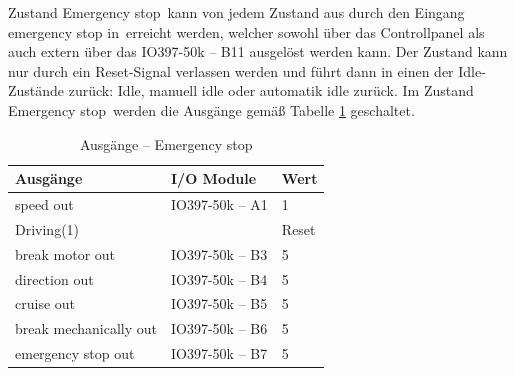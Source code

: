 Zustand \frqq Emergency stop\flqq\ kann von jedem Zustand aus durch den Eingang \frqq emergency stop in\flqq\ erreicht werden, welcher sowohl über das Controllpanel als auch extern über das IO397-50k – B11 ausgelöst werden kann. Der Zustand kann nur durch ein Reset-Signal verlassen werden und führt dann in einen der Idle-Zustände zurück: Idle, manuell idle oder automatik idle zurück. Im Zustand \frqq Emergency stop\flqq\ werden die Ausgänge gemäß Tabelle \ref{Automat_man:tab:z_Emergency_stop} geschaltet.


\pagebreak[1]
\begin{table}[!ht]
	\centering
	\caption{Ausgänge – Emergency stop}
	\label{Automat_man:tab:z_Emergency_stop}
	\begin{tabular}{lll}
		\hline
		\textbf{Ausgänge}                           & \textbf{I/O Module}                 & \textbf{Wert} \\ \hline
		\multicolumn{1}{l|}{speed out}              & \multicolumn{1}{l|}{IO397-50k – A1} & 1             \\
		\multicolumn{1}{l|}{Driving(1)}             & \multicolumn{1}{l|}{}               & Reset         \\
		\multicolumn{1}{l|}{break motor out}        & \multicolumn{1}{l|}{IO397-50k – B3} & 5             \\
		\multicolumn{1}{l|}{direction out}          & \multicolumn{1}{l|}{IO397-50k – B4} & 5             \\
		\multicolumn{1}{l|}{cruise out}             & \multicolumn{1}{l|}{IO397-50k – B5} & 5             \\
		\multicolumn{1}{l|}{break mechanically out} & \multicolumn{1}{l|}{IO397-50k – B6} & 5             \\
		\multicolumn{1}{l|}{emergency stop out}     & \multicolumn{1}{l|}{IO397-50k – B7} & 5             \\ \hline
	\end{tabular}
\end{table}
\pagebreak[4]









